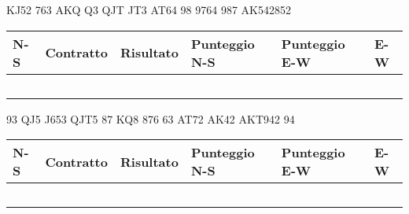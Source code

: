 \documentclass[a4paper,italian,12pt]{article}
\begin{document}
\newpage

\begin{tcolorbox}
\begin{minipage}{.3\textwidth}
\newgame
{}
       {KJ52}  {763}  {AKQ}     
       {Q3}  {QJT}   {JT3}    
     {AT64}    {98}  {9764}    
       {987}  {AK542}{852}       

    \hspace{-.2cm}\showAll
\end{minipage}
\begin{minipage}{.7\textwidth}

\renewcommand{\arraystretch}{2}
\begin{tabular}{|l|l|l|l|l|l|}
\hline
N-S & Contratto\hspace{1.5cm} & Risultato& Punteggio N-S & Punteggio E-W & E-W\\\hline
  &&&&&\\\hline
   &&&&&\\\hline
    &&&&&\\\hline
     &&&&&\\\hline
          &&&&&\\\hline
\end{tabular}
\end{minipage}
\end{tcolorbox}

\medskip

\begin{tcolorbox}
\begin{minipage}{.3\textwidth}
\newgame
{}
     {93} {QJ5} {J653}
     {QJT5} {87} {KQ8}
     {876} {63} {AT72}
     {AK42} {AKT942} {94}
    \hspace{-.2cm}\showAll
\end{minipage}
\begin{minipage}{.7\textwidth}

\renewcommand{\arraystretch}{2}
\begin{tabular}{|l|l|l|l|l|l|}
\hline
N-S & Contratto\hspace{1.5cm} & Risultato& Punteggio N-S & Punteggio E-W & E-W\\\hline
  &&&&&\\\hline
   &&&&&\\\hline
    &&&&&\\\hline
     &&&&&\\\hline
          &&&&&\\\hline
\end{tabular}
\end{minipage}
\end{tcolorbox}
\end{document}
